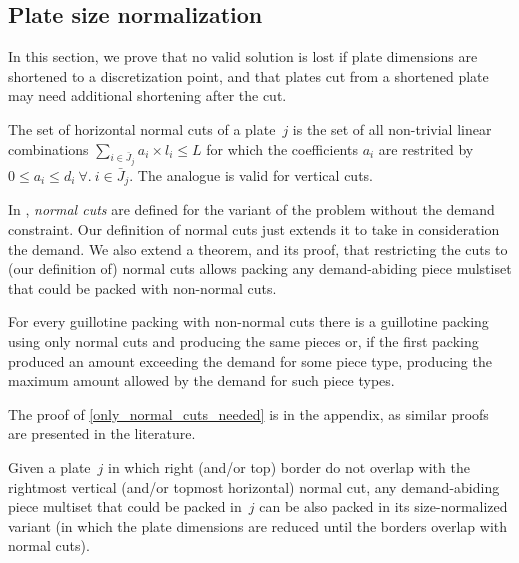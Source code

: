 \documentclass[runningheads]{llncs}
\begin{document}
\subsection{Plate size normalization}

In this section, we prove that no valid solution is lost if plate dimensions are shortened to a discretization point, and that plates cut from a shortened plate may need additional shortening after the cut.


\begin{definition}
The set of horizontal normal cuts of a plate~\(j\) is the set of all non-trivial linear combinations \(\sum_{i \in \bar{J}_j} a_i \times l_i \leq L\) for which the coefficients \(a_i\) are restrited by \(0 \leq a_i \leq d_i~\forall.~i \in \bar{J}_j\). The analogue is valid for vertical cuts.
\end{definition}

In \cite{nicos:1977}, \emph{normal cuts} are defined for the variant of the problem without the demand constraint.
Our definition of normal cuts just extends it to take in consideration the demand.
We also extend a theorem, and its proof, that restricting the cuts to (our definition of) normal cuts allows packing any demand-abiding piece mulstiset that could be packed with non-normal cuts.

\begin{theorem}\label{only_normal_cuts_needed}
For every guillotine packing with non-normal cuts there is a guillotine packing using only normal cuts and producing the same pieces or, if the first packing produced an amount exceeding the demand for some piece type, producing the maximum amount allowed by the demand for such piece types.
\end{theorem}

The proof of \autoref{only_normal_cuts_needed} is in the appendix, as similar proofs are presented in the literature.

\begin{corollary}\label{co:size_normalized_plate}
Given a plate~\(j\) in which right (and/or top) border do not overlap with the rightmost vertical (and/or topmost horizontal) normal cut, any demand-abiding piece multiset that could be packed in~\(j\) can be also packed in its size-normalized variant (in which the plate dimensions are reduced until the borders overlap with normal cuts).
\end{corollary}
\end{document}
